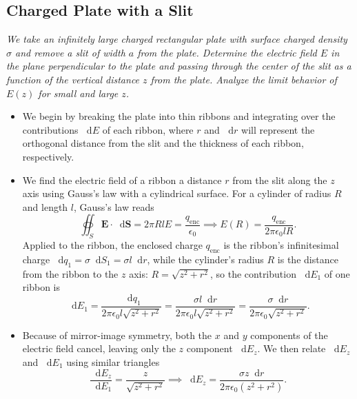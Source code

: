 \documentclass[11pt, a4paper]{article}
\newcommand{\diff}{\mathop{}\!\mathrm{d}} %
\renewcommand{\vec}[1]{\bm{#1}} %
\newcommand{\ee}{\epsilon_{0}}  %
\begin{document}
\subsection{Charged Plate with a Slit}
\textit{We take an infinitely large charged rectangular plate with surface charged density $ \sigma $ and remove a slit of width $ a $ from the plate. Determine the electric field $ E $ in the plane perpendicular to the plate and passing through the center of the slit as a function of the vertical distance $ z $ from the plate. Analyze the limit behavior of $ E(z) $ for small and large $ z $.}
\begin{itemize}
	\item We begin by breaking the plate into thin ribbons and integrating over the contributions $ \diff E $ of each ribbon, where $ r $ and $ \diff r $ will represent the orthogonal distance from the slit and the thickness of each ribbon, respectively.
	
	\item We find the electric field of a ribbon a distance $ r $ from the slit along the $ z $ axis using Gauss's law with a cylindrical surface. For a cylinder of radius $ R $ and length $ l $, Gauss's law reads
	\begin{equation*}
		\oiint_{S} \vec{E} \cdot \diff \vec{S} = 2\pi R l E = \frac{q_{\text{enc}}}{\ee} \implies E(R) = \frac{q_{\text{enc}}}{2\pi \ee l R}.
	\end{equation*}
	Applied to the ribbon, the enclosed charge $ q_{\text{enc}} $ is the ribbon's infinitesimal charge $ \diff q_{1} = \sigma \diff S_{1} = \sigma l \diff r $, while the cylinder's radius $ R $ is the distance from the ribbon to the $ z $ axis: $ R = \sqrt{z^{2} + r^{2}} $, so the contribution $ \diff E_{1} $ of one ribbon is
	\begin{equation*}
		\diff E_{1} = \frac{\diff q_{1}}{2\pi \ee l \sqrt{z^{2} + r^{2}}} = \frac{\sigma l \diff r}{2\pi \ee l\sqrt{z^{2} + r^{2}} } = \frac{\sigma \diff r}{2\pi \ee \sqrt{z^{2} + r^{2}} }.
	\end{equation*}
	
	\item Because of mirror-image symmetry, both the $ x $ and $ y $ components of the electric field cancel, leaving only the $ z $ component $ \diff E_{z} $. We then relate $ \diff E_{z} $ and $ \diff E_{1} $ using similar triangles
	\begin{equation*}
		\frac{\diff E_{z}}{\diff E_{1}} = \frac{z}{\sqrt{z^{2} + r^{2}}} \implies  \diff E_{z} = \frac{\sigma z \diff r}{2\pi \ee (z^{2} + r^{2})}.
	\end{equation*}
	

\end{itemize}
\end{document}

